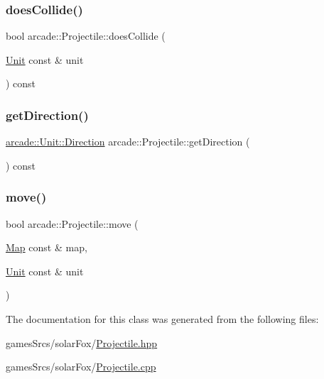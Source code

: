 \subsubsection{\texorpdfstring{does\+Collide()}{doesCollide()}}
{\footnotesize\ttfamily bool arcade\+::\+Projectile\+::does\+Collide (\begin{DoxyParamCaption}\item[{\hyperlink{classarcade_1_1_unit}{Unit} const \&}]{unit }\end{DoxyParamCaption}) const}

\mbox{\label{classarcade_1_1_projectile_a29c62daa5cbdaa3e3dfdcf8265a86913}} 
\subsubsection{\texorpdfstring{get\+Direction()}{getDirection()}}
{\footnotesize\ttfamily \hyperlink{classarcade_1_1_unit_af418afeaba1f7fd5934b6ae1343215dd}{arcade\+::\+Unit\+::\+Direction} arcade\+::\+Projectile\+::get\+Direction (\begin{DoxyParamCaption}{ }\end{DoxyParamCaption}) const}

\mbox{\label{classarcade_1_1_projectile_a991b6754b6a12089b2b527d35f2d3ca9}} 
\subsubsection{\texorpdfstring{move()}{move()}}
{\footnotesize\ttfamily bool arcade\+::\+Projectile\+::move (\begin{DoxyParamCaption}\item[{\hyperlink{classarcade_1_1_map}{Map} const \&}]{map,  }\item[{\hyperlink{classarcade_1_1_unit}{Unit} const \&}]{unit }\end{DoxyParamCaption})}



The documentation for this class was generated from the following files\+:\begin{DoxyCompactItemize}
\item 
games\+Srcs/solar\+Fox/\hyperlink{_projectile_8hpp}{Projectile.\+hpp}\item 
games\+Srcs/solar\+Fox/\hyperlink{_projectile_8cpp}{Projectile.\+cpp}\end{DoxyCompactItemize}
